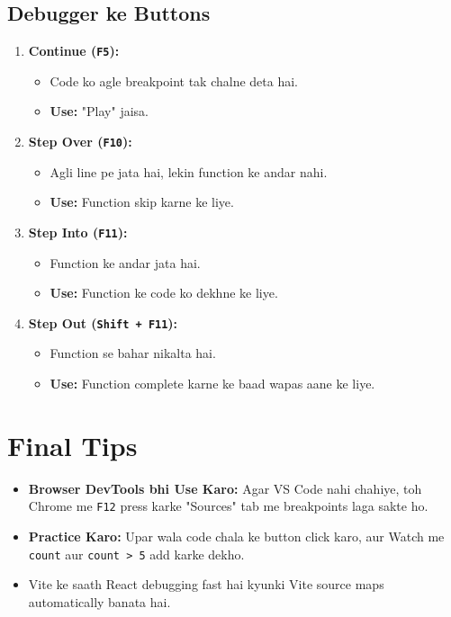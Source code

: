 \documentclass[a4paper,12pt]{article}
\begin{document}
\subsection{ Debugger ke Buttons}
\begin{enumerate}
    \item \textbf{\color{myblue}Continue (\texttt{\color{mygreen}F5}):}  
    \begin{itemize}
        \item Code ko agle breakpoint tak chalne deta hai.
        \item \textbf{\color{myblue}Use:} "Play" jaisa.
    \end{itemize}

    \item \textbf{\color{myblue}Step Over (\texttt{\color{mygreen}F10}):}  
    \begin{itemize}
        \item Agli line pe jata hai, lekin function ke andar nahi.
        \item \textbf{\color{myblue}Use:} Function skip karne ke liye.
    \end{itemize}

    \item \textbf{\color{myblue}Step Into (\texttt{\color{mygreen}F11}):}  
    \begin{itemize}
        \item Function ke andar jata hai.
        \item \textbf{\color{myblue}Use:} Function ke code ko dekhne ke liye.
    \end{itemize}

    \item \textbf{\color{myblue}Step Out (\texttt{\color{mygreen}Shift + F11}):}  
    \begin{itemize}
        \item Function se bahar nikalta hai.
        \item \textbf{\color{myblue}Use:} Function complete karne ke baad wapas aane ke liye.
    \end{itemize}
\end{enumerate}

\section{ Final Tips}
\begin{itemize}
    \item \textbf{\color{myblue}Browser DevTools bhi Use Karo:} Agar VS Code nahi chahiye, toh Chrome me \texttt{\color{mygreen}F12} press karke "Sources" tab me breakpoints laga sakte ho.
    \item \textbf{\color{myblue}Practice Karo:} Upar wala code chala ke button click karo, aur Watch me \texttt{\color{mygreen}count} aur \texttt{\color{mygreen}count > 5} add karke dekho.
    \item Vite ke saath React debugging fast hai kyunki Vite source maps automatically banata hai.
\end{itemize}
\end{document}
